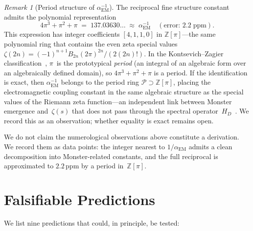 \documentclass[11pt,a4paper]{article}
\theoremstyle{plain}
\theoremstyle{remark}
\newtheorem{remark}[theorem]{Remark}
\newcommand{\Z}{\mathbb{Z}}
\newcommand{\aEM}{\alpha_{\mathrm{EM}}}
\begin{document}
\begin{remark}[Period structure of $\aEM^{-1}$]
\label{rem:alpha-period}
The reciprocal fine structure constant admits the polynomial
representation
\begin{equation}\label{eq:alpha-period}
  4\pi^3 + \pi^2 + \pi \;=\; 137.03630\ldots
  \;\approx\; \aEM^{-1}
  \quad(\text{error: }2.2\;\mathrm{ppm}).
\end{equation}
This expression has integer coefficients $[4,1,1,0]$ in $\Z[\pi]$---the
same polynomial ring that contains the even zeta special values
$\zeta(2n) = (-1)^{n+1}B_{2n}(2\pi)^{2n}/(2(2n)!)$.  In the
Kontsevich--Zagier classification~\cite{kontsevich-zagier2001}, $\pi$~is
the prototypical \emph{period} (an integral of an algebraic form over an
algebraically defined domain), so $4\pi^3+\pi^2+\pi$ is a period.  If
the identification is exact, then $\aEM^{-1}$ belongs to the period ring
$\mathcal{P}\supset\Z[\pi]$, placing the electromagnetic coupling
constant in the same algebraic structure as the special values of the
Riemann zeta function---an independent link between Monster emergence
and~$\zeta(s)$ that does not pass through the spectral
operator~$H_D$~\cite{DHR2026a}.
We record this as an observation; whether equality is exact remains open.
\end{remark}

\medskip
We do not claim the numerological observations above constitute a
derivation.  We record them as data points: the integer nearest to
$1/\aEM$ admits a clean decomposition into Monster-related constants,
and the full reciprocal is approximated to $2.2$\,ppm by a period
in~$\Z[\pi]$.


\section{Falsifiable Predictions}
\label{sec:predictions}

We list nine predictions that could, in principle, be tested:
\end{document}
